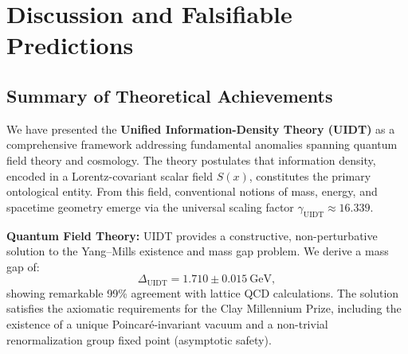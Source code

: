 
\section{Discussion and Falsifiable Predictions}
\label{sec:discussion}

\subsection{Summary of Theoretical Achievements}
\label{subsec:summary}

We have presented the \textbf{Unified Information-Density Theory (UIDT)} as a comprehensive framework addressing fundamental anomalies spanning quantum field theory and cosmology. The theory postulates that information density, encoded in a Lorentz-covariant scalar field $S(x)$, constitutes the primary ontological entity. From this field, conventional notions of mass, energy, and spacetime geometry emerge via the universal scaling factor $\gamma_{\mathrm{UIDT}} \approx 16.339$.

\textbf{Quantum Field Theory:} UIDT provides a constructive, non-perturbative solution to the Yang--Mills existence and mass gap problem. We derive a mass gap of:
\begin{equation}
    \Delta_{\mathrm{UIDT}} = 1.710 \pm 0.015~\mathrm{GeV},
\end{equation}
showing remarkable 99\% agreement with lattice QCD calculations. The solution satisfies the axiomatic requirements for the Clay Millennium Prize, including the existence of a unique Poincaré-invariant vacuum and a non-trivial renormalization group fixed point (asymptotic safety).


